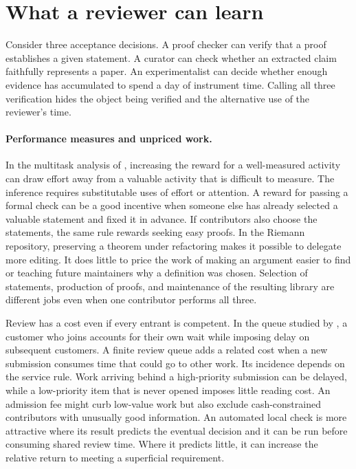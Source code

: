 \documentclass[11pt,letterpaper]{article}
\begin{document}
\section{What a reviewer can learn}

Consider three acceptance decisions. A proof checker can verify that a proof establishes a given statement. A curator can check whether an extracted claim faithfully represents a paper. An experimentalist can decide whether enough evidence has accumulated to spend a day of instrument time. Calling all three verification hides the object being verified and the alternative use of the reviewer's time.

\paragraph{Performance measures and unpriced work.}
In the multitask analysis of \citet{holmstrom}, increasing the reward for a well-measured activity can draw effort away from a valuable activity that is difficult to measure. The inference requires substitutable uses of effort or attention. A reward for passing a formal check can be a good incentive when someone else has already selected a valuable statement and fixed it in advance. If contributors also choose the statements, the same rule rewards seeking easy proofs. In the Riemann repository, preserving a theorem under refactoring makes it possible to delegate more editing. It does little to price the work of making an argument easier to find or teaching future maintainers why a definition was chosen. Selection of statements, production of proofs, and maintenance of the resulting library are different jobs even when one contributor performs all three.

Review has a cost even if every entrant is competent. In the queue studied by \citet{naor}, a customer who joins accounts for their own wait while imposing delay on subsequent customers. A finite review queue adds a related cost when a new submission consumes time that could go to other work. Its incidence depends on the service rule. Work arriving behind a high-priority submission can be delayed, while a low-priority item that is never opened imposes little reading cost. An admission fee might curb low-value work but also exclude cash-constrained contributors with unusually good information. An automated local check is more attractive where its result predicts the eventual decision and it can be run before consuming shared review time. Where it predicts little, it can increase the relative return to meeting a superficial requirement.
\end{document}
